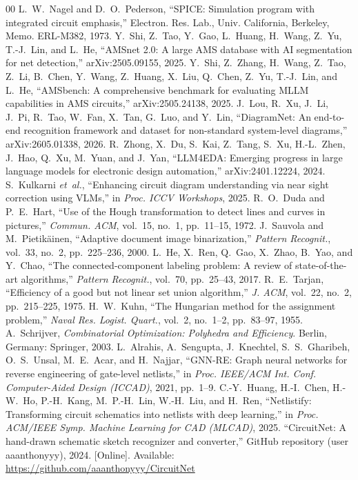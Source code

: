 \documentclass{ieeeaccess}
\begin{document}
\begin{thebibliography}{00}
 L.~W.~Nagel and D.~O.~Pederson, ``SPICE: Simulation program with integrated circuit emphasis,'' Electron. Res. Lab., Univ. California, Berkeley, Memo. ERL-M382, 1973.
 Y.~Shi, Z.~Tao, Y.~Gao, L.~Huang, H.~Wang, Z.~Yu, T.-J.~Lin, and L.~He, ``AMSnet 2.0: A large AMS database with AI segmentation for net detection,'' arXiv:2505.09155, 2025.
 Y.~Shi, Z.~Zhang, H.~Wang, Z.~Tao, Z.~Li, B.~Chen, Y.~Wang, Z.~Huang, X.~Liu, Q.~Chen, Z.~Yu, T.-J.~Lin, and L.~He, ``AMSbench: A comprehensive benchmark for evaluating MLLM capabilities in AMS circuits,'' arXiv:2505.24138, 2025.
 J.~Lou, R.~Xu, J.~Li, J.~Pi, R.~Tao, W.~Fan, X.~Tan, G.~Luo, and Y.~Lin, ``DiagramNet: An end-to-end recognition framework and dataset for non-standard system-level diagrams,'' arXiv:2605.01338, 2026.
 R.~Zhong, X.~Du, S.~Kai, Z.~Tang, S.~Xu, H.-L.~Zhen, J.~Hao, Q.~Xu, M.~Yuan, and J.~Yan, ``LLM4EDA: Emerging progress in large language models for electronic design automation,'' arXiv:2401.12224, 2024.
 S.~Kulkarni \textit{et~al.}, ``Enhancing circuit diagram understanding via near sight correction using VLMs,'' in \textit{Proc. ICCV Workshops}, 2025.
 R.~O.~Duda and P.~E.~Hart, ``Use of the Hough transformation to detect lines and curves in pictures,'' \textit{Commun. ACM}, vol.~15, no.~1, pp.~11--15, 1972.
 J.~Sauvola and M.~Pietik\"{a}inen, ``Adaptive document image binarization,'' \textit{Pattern Recognit.}, vol.~33, no.~2, pp.~225--236, 2000.
 L.~He, X.~Ren, Q.~Gao, X.~Zhao, B.~Yao, and Y.~Chao, ``The connected-component labeling problem: A review of state-of-the-art algorithms,'' \textit{Pattern Recognit.}, vol.~70, pp.~25--43, 2017.
 R.~E.~Tarjan, ``Efficiency of a good but not linear set union algorithm,'' \textit{J. ACM}, vol.~22, no.~2, pp.~215--225, 1975.
 H.~W.~Kuhn, ``The Hungarian method for the assignment problem,'' \textit{Naval Res. Logist. Quart.}, vol.~2, no.~1--2, pp.~83--97, 1955.
 A.~Schrijver, \textit{Combinatorial Optimization: Polyhedra and Efficiency}. Berlin, Germany: Springer, 2003.
 L.~Alrahis, A.~Sengupta, J.~Knechtel, S.~S.~Gharibeh, O.~S.~Unsal, M.~E.~Acar, and H.~Najjar, ``GNN-RE: Graph neural networks for reverse engineering of gate-level netlists,'' in \textit{Proc. IEEE/ACM Int. Conf. Computer-Aided Design (ICCAD)}, 2021, pp.~1--9.
 C.-Y.~Huang, H.-I.~Chen, H.-W.~Ho, P.-H.~Kang, M.~P.-H.~Lin, W.-H.~Liu, and H.~Ren, ``Netlistify: Transforming circuit schematics into netlists with deep learning,'' in \textit{Proc. ACM/IEEE Symp. Machine Learning for CAD (MLCAD)}, 2025.
 ``CircuitNet: A hand-drawn schematic sketch recognizer and converter,'' GitHub repository (user aaanthonyyy), 2024. [Online]. Available: \url{https://github.com/aaanthonyyy/CircuitNet}
\end{thebibliography}
\end{document}
